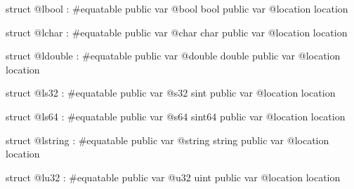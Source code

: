 
\begin{galgas4}
struct @lbool : #equatable {
  public var @bool bool
  public var @location location
}
\end{galgas4}




\begin{galgas4}
struct @lchar : #equatable {
  public var @char char
  public var @location location
}
\end{galgas4}



\begin{galgas4}
struct @ldouble : #equatable {
  public var @double double
  public var @location location
}
\end{galgas4}








\begin{galgas4}
struct @ls32 : #equatable {
  public var @s32 sint
  public var @location location
}
\end{galgas4}









\begin{galgas4}
struct @ls64 : #equatable {
  public var @s64 sint64
  public var @location location
}
\end{galgas4}








\begin{galgas4}
struct @lstring : #equatable {
  public var @string string
  public var @location location
}
\end{galgas4}








\begin{galgas4}
struct @lu32 : #equatable {
  public var @u32 uint
  public var @location location
}
\end{galgas4}





